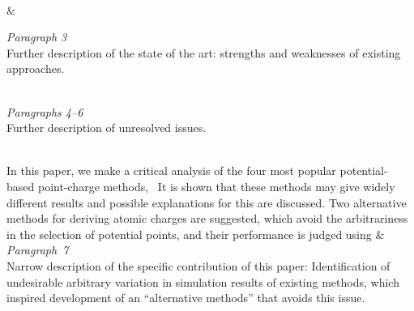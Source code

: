 \documentclass[12pt, a4paper, oneside]{article}
\newlength{\smalllinespacing}
\theoremstyle{Plain}
\theoremstyle{Definition}
\theoremstyle{Remark}
\begin{document}
\begin{tcolorbox}
\begin{tblr}{}
{			\\
			\null\hspace{\smalllinespacing}\textellipsis
		}
		&
		{%
			\textit{Paragraph 3} \\
			Further description of the state of the art: strengths and weaknesses of existing approaches. \\
			\strut \\[2ex]
			\textit{Paragraphs 4--6} \\
			Further description of unresolved issues.
		}
		\\
		\hspace{\smalllinespacing}In this paper, we make a critical analysis of the four most popular potential-based point-charge methods, \textellipsis\ It is shown that these methods may give widely different results and possible explanations for this are discussed. Two alternative methods for deriving atomic charges are suggested, which avoid the arbitrariness in the selection of potential points, and their performance is judged using \textellipsis
		&
		{%
			\textit{Paragraph~7} \\
			Narrow description of the specific contribution of this paper: Identification of undesirable arbitrary variation in simulation results of existing methods, which inspired development of an ``alternative methods'' that avoids this issue.
		}
	\end{tblr}
\end{tcolorbox}
\end{document}
